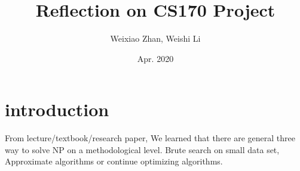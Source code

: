 \documentclass[12pt, a4paper]{article}
\title{Reflection on CS170 Project}
\author{Weixiao Zhan, Weishi Li}
\date{Apr. 2020}
\begin{document}
\maketitle
\clearpage

\section*{introduction}
From lecture/textbook/research paper, We learned that there are general three way to solve NP on a methodological level.
Brute search on small data set, Approximate algorithms or continue optimizing algorithms.  
\end{document}
